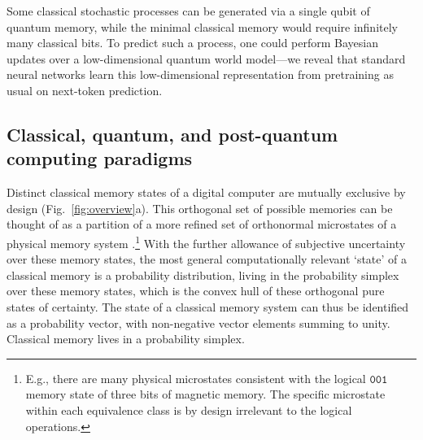 \documentclass[prx,nofootinbib,onecolumn,showkeys,groupaddress,preprintnumbers,floatfix,
superscriptaddress]{revtex4-1}
\begin{document}
Some classical stochastic processes can be generated via a single qubit of quantum memory, while the minimal classical memory would require infinitely many classical bits.
To predict such a process, one could perform Bayesian updates over a low-dimensional quantum world model---we reveal that standard neural networks learn this low-dimensional representation from pretraining as usual on next-token prediction.


\subsection{Classical, quantum, and post-quantum computing paradigms}

Distinct classical memory states 
of a digital computer 
are 
mutually exclusive by design (Fig.~\ref{fig:overview}a).
This orthogonal 
set of possible memories can be thought of as a partition of a more refined set of orthonormal microstates of a physical memory system
\cite{Riec19_Transforming}.\footnote{E.g., there are many physical microstates consistent with the logical $\texttt{001}$ memory state of three bits of magnetic memory. The specific microstate within each equivalence class is by design irrelevant to the logical operations.}
With the further allowance of subjective uncertainty over these memory states,
the most general computationally relevant `state' of a classical memory is a probability distribution, living in the probability simplex over these memory states, which is the convex hull of these orthogonal pure states of certainty.  
The state of a classical memory system
can thus be identified as a probability vector, with non-negative vector elements summing to unity.
Classical memory lives in a probability simplex.
\end{document}

